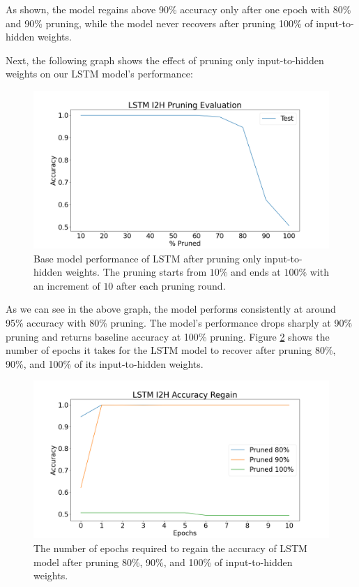 As shown, the model regains above 90\% accuracy only after one epoch with 80\% and 90\% pruning, while the model never recovers after pruning 100\% of input-to-hidden weights.

Next, the following graph shows the effect of pruning only input-to-hidden weights on our LSTM model's performance:

\begin{figure}[h]
	\centering
	\includegraphics[width=0.8\linewidth]{images/results/pruning_i2h/lstm_i2h_pruning_evaluation.png}
	\caption[LSTM base model performance after pruning i2h weights]%
	{Base model performance of LSTM after pruning only input-to-hidden weights. The pruning starts from $10\%$ and ends at $100\%$ with an increment of $10$ after each pruning round.}
	\label{fig:lstm_i2h_prune}
\end{figure}

As we can see in the above graph, the model performs consistently at around 95\% accuracy with 80\% pruning. The model's performance drops sharply at 90\% pruning and returns baseline accuracy at 100\% pruning. Figure \ref{fig:lstm_i2h_prune_regain} shows the number of epochs it takes for the LSTM model to recover after pruning 80\%, 90\%, and 100\% of its input-to-hidden weights.

\begin{figure}[h]
	\centering
	\includegraphics[width=0.8\linewidth]{images/results/pruning_i2h/lstm_i2h_accuracy_regain.png}
	\caption[LSTM base model performance regain after pruning i2h weights]%
	{The number of epochs required to regain the accuracy of LSTM model after pruning 80\%, 90\%, and 100\% of input-to-hidden weights.}
	\label{fig:lstm_i2h_prune_regain}
\end{figure}

